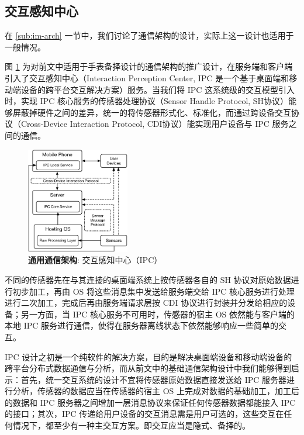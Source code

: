 \subsection{交互感知中心}

在 \ref{sub:im-arch} 一节中，我们讨论了通信架构的设计，实际上这一设计也适用于一般情况。

图 \ref{fig:universe-arch} 为对前文中适用于手表备择设计的通信架构的推广设计，在服务端和客户端引入了交互感知中心（Interaction Perception Center, IPC 是一个基于桌面端和移动端设备的跨平台交互解决方案）服务\cite{Changkun:2015ipc}。当我们将 IPC 这系统级的交互模型引入时，实现 IPC 核心服务的传感器处理协议（Sensor Handle Protocol, SH协议）能够屏蔽掉硬件之间的差异，统一的将传感器形式化、标准化，而通过跨设备交互协议（Cross-Device Interaction Protocol, CDI协议）能实现用户设备与 IPC 服务之间的通信。

\begin{figure}[H]
    \centering
    \includegraphics[width=0.4\textwidth]{figures/universe-arch}
    \caption{\kaishu \textbf{通用通信架构}: 交互感知中心（IPC）}
    \label{fig:universe-arch}
\end{figure}

不同的传感器先在与其连接的桌面端系统上按传感器各自的 SH 协议对原始数据进行初步加工，再由 OS 将这些消息集中发送给服务端交给 IPC 核心服务进行处理进行二次加工，完成后再由服务端请求层按 CDI 协议进行封装并分发给相应的设备；另一方面，当 IPC 核心服务不可用时，传感器的宿主 OS 依然能与客户端的本地 IPC 服务进行通信，使得在服务器离线状态下依然能够响应一些简单的交互。

IPC 设计之初是一个纯软件的解决方案，目的是解决桌面端设备和移动端设备的跨平台分布式数据通信与分析，而从前文中的基础通信架构设计中我们能够得到启示：首先，统一交互系统的设计不宜将传感器原始数据直接发送给 IPC 服务器进行分析，传感器的数据应当在传感器的宿主 OS 上完成对数据的基础加工，加工后的数据和 IPC 服务器之间增加一层消息协议来保证任何传感器数据都能接入 IPC 的接口；其次，IPC 传递给用户设备的交互消息需是用户可选的，这些交互在任何情况下，都至少有一种主交互方案。即交互应当是隐式、备择的。

